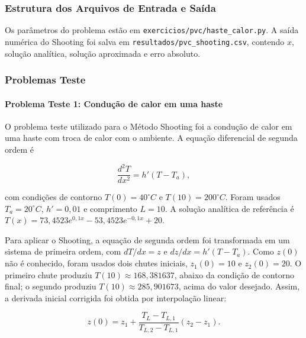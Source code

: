 \subsubsection{Estrutura dos Arquivos de Entrada e Saída}

Os parâmetros do problema estão em \texttt{exercicios/pvc/haste\_calor.py}. A saída numérica do Shooting foi salva em \texttt{resultados/pvc\_shooting.csv}, contendo \(x\), solução analítica, solução aproximada e erro absoluto.

\subsubsection{Problemas Teste}

\paragraph{Problema Teste 1: Condução de calor em uma haste}

O problema teste utilizado para o Método Shooting foi a condução de calor em uma haste com troca de calor com o ambiente. A equação diferencial de segunda ordem é

\[
    \frac{d^2T}{dx^2}=h'(T-T_a),
\]

com condições de contorno \(T(0)=40^\circ C\) e \(T(10)=200^\circ C\). Foram usados \(T_a=20^\circ C\), \(h'=0{,}01\) e comprimento \(L=10\). A solução analítica de referência é \(T(x)=73{,}4523e^{0{,}1x}-53{,}4523e^{-0{,}1x}+20\).

Para aplicar o Shooting, a equação de segunda ordem foi transformada em um sistema de primeira ordem, com \(dT/dx=z\) e \(dz/dx=h'(T-T_a)\). Como \(z(0)\) não é conhecido, foram usados dois chutes iniciais, \(z_1(0)=10\) e \(z_2(0)=20\). O primeiro chute produziu \(T(10)\approx168{,}381637\), abaixo da condição de contorno final; o segundo produziu \(T(10)\approx285{,}901673\), acima do valor desejado. Assim, a derivada inicial corrigida foi obtida por interpolação linear:

\[
    z(0)=z_1+\frac{T_L-T_{L,1}}{T_{L,2}-T_{L,1}}(z_2-z_1).
\]

